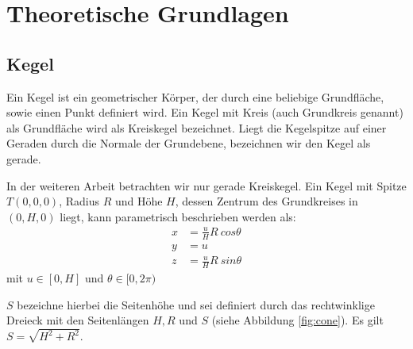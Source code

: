 \chapter{Theoretische Grundlagen}
\label{ch:theory}

%


\section{Kegel}
\label{s:cone}

\begin{definition}[Kegel]
	Ein Kegel ist ein geometrischer Körper, der durch eine beliebige Grundfläche, sowie einen Punkt definiert wird.
	Ein Kegel mit Kreis (auch Grundkreis genannt) als Grundfläche wird als Kreiskegel bezeichnet. Liegt die Kegelspitze auf einer Geraden durch die Normale der Grundebene, bezeichnen wir den Kegel als gerade.
\end{definition}

In der weiteren Arbeit betrachten wir nur gerade Kreiskegel. Ein Kegel mit Spitze $T(0,0,0)$, Radius $R$ und Höhe $H$, dessen Zentrum des Grundkreises in $(0,H,0)$ liegt, kann parametrisch beschrieben werden als:
\begin{equation} \label{eq:paramCone}
\begin{aligned}
x &= \frac{u}{H} R~cos \theta \\
y &= u \\
z &= \frac{u}{H} R~sin \theta
\end{aligned}
\end{equation} %
mit $u\in [0, H]$ und $\theta \in [0, 2\pi)$ 

$S$ bezeichne hierbei die Seitenhöhe und sei definiert durch das rechtwinklige Dreieck mit den Seitenlängen $H,R$ und $S$ (siehe Abbildung \ref{fig:cone}). Es gilt $S = \sqrt{H^2 + R^2}$.

